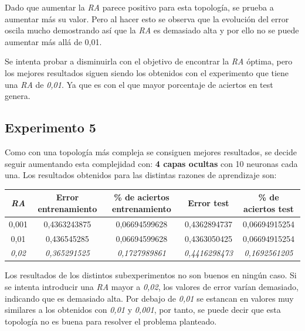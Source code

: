 \documentclass{uc3mpracticas}
\begin{document}
\vspace{2mm}

Dado que aumentar la \textit{RA} parece positivo para esta topología, se prueba a aumentar más su valor. Pero al hacer esto se observa que la evolución del error oscila mucho demostrando así que la \textit{RA} es demasiado alta y por ello no se puede aumentar más allá de 0,01.

\vspace{2mm}

Se intenta probar a disminuirla con el objetivo de encontrar la \textit{RA} óptima, pero los mejores resultados siguen siendo los obtenidos con el experimento que tiene una \textit{RA} de \textit{0,01}. Ya que es con el que mayor porcentaje de aciertos en test genera.


\subsection{Experimento 5}

Como con una topología más compleja se consiguen mejores resultados, se decide seguir aumentando esta complejidad con: \textbf{4 capas ocultas} con 10 neuronas cada una. Los resultados obtenidos para las distintas razones de aprendizaje son:

\begin{center}
  \begin{tabular}{|c|c|c|c|c|}
    \hline
        \textit{\textbf{RA}}  & \textbf{Error entrenamiento} & \textbf{\% de aciertos entrenamiento} & \textbf{Error test} & \textbf{\% de aciertos test}\\ \hline
        0,001                 &  0,4363243875                &  0,06694599628                        &  0,4362894737       &  0,06694915254              \\ \hline
        0,01                  &  0,436545285                 &  0,06694599628                        &  0,4363050425       &  0,06694915254              \\ \hline
        \textit{0,02}         &  \textit{0,365291525}        &  \textit{0,1727989861}                &  \textit{0,4416298473}&  \textit{0,1692561205}    \\ \hline

  \end{tabular}
\end{center}

Los resultados de los distintos subexperimentos no son buenos en ningún caso. Si se intenta introducir una \textit{RA} mayor a \textit{0,02}, los valores de error varían demasiado, indicando que es demasiado alta. Por debajo de \textit{0,01} se estancan en valores muy similares a los obtenidos con \textit{0,01} y \textit{0,001}, por tanto, se puede decir que esta topología no es buena para resolver el problema planteado.
\end{document}
